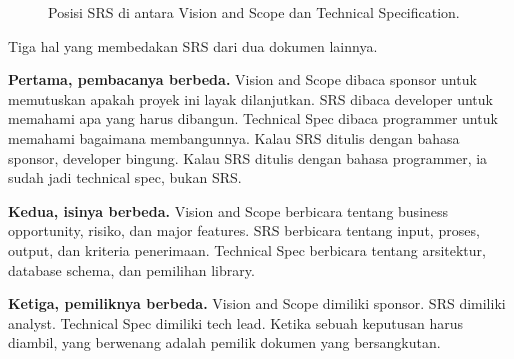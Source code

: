 \documentclass[11pt,a4paper]{article}
\begin{document}
\begin{figure}[H]
	\centering
	\caption{Posisi SRS di antara Vision and Scope dan Technical Specification.}
	\label{fig:doc-chain}
\end{figure}

Tiga hal yang membedakan SRS dari dua dokumen lainnya.

\textbf{Pertama, pembacanya berbeda.} Vision and Scope dibaca sponsor untuk memutuskan apakah proyek ini layak dilanjutkan. SRS dibaca developer untuk memahami apa yang harus dibangun. Technical Spec dibaca programmer untuk memahami bagaimana membangunnya. Kalau SRS ditulis dengan bahasa sponsor, developer bingung. Kalau SRS ditulis dengan bahasa programmer, ia sudah jadi technical spec, bukan SRS.

\textbf{Kedua, isinya berbeda.} Vision and Scope berbicara tentang business opportunity, risiko, dan major features. SRS berbicara tentang input, proses, output, dan kriteria penerimaan. Technical Spec berbicara tentang arsitektur, database schema, dan pemilihan library.

\textbf{Ketiga, pemiliknya berbeda.} Vision and Scope dimiliki sponsor. SRS dimiliki analyst. Technical Spec dimiliki tech lead. Ketika sebuah keputusan harus diambil, yang berwenang adalah pemilik dokumen yang bersangkutan.
\end{document}
